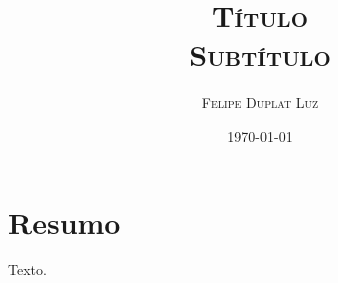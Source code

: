\documentclass{article}
\title{\textbf{\textsc{Título}} \\ \Large \textsc{Subtítulo}}
\author{\textsc{Felipe Duplat Luz}}
\date{\textsc{\today}}
\begin{document}
	\maketitle
	
\section*{Resumo}
\setlength\parskip{0.3cm}

Texto. \cite{jones71,samuelson71}



\pagebreak
\printbibliography[title={Referências:}]
\end{document}
